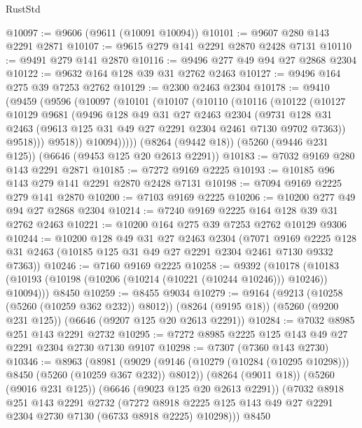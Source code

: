 \begin{lexlean}{RustStd}
\begin{coremodule}
@10097 := @9606 (@9611 (@10091 @10094))
@10101 := @9607 @280 @143 @2291 @2871
@10107 := @9615 @279 @141 @2291 @2870 @2428 @7131
@10110 := @9491 @279 @141 @2870
@10116 := @9496 @277 @49 @94 @27 @2868 @2304
@10122 := @9632 @164 @128 @39 @31 @2762 @2463
@10127 := @9496 @164 @275 @39 @7253 @2762
@10129 := @2300 @2463 @2304
@10178 := @9410
    (@9459
      (@9596
        (@10097
          (@10101
            (@10107
              (@10110
                (@10116
                  (@10122
                    (@10127
                      @10129
                      @9681
                      (@9496
                        @128
                        @49
                        @31
                        @27
                        @2463
                        @2304
                        (@9731
                          @128
                          @31
                          @2463
                          (@9613 @125 @31 @49 @27 @2291 @2304 @2461 @7130 @9702 @7363))
                        @9518)))
                  @9518))
              @10094)))))
    (@8264 (@9442 @18))
    (@5260 (@9446 @231 @125))
    (@6646 (@9453 @125 @20 @2613 @2291))
@10183 := @7032 @9169 @280 @143 @2291 @2871
@10185 := @7272 @9169 @2225
@10193 := @10185 @96 @143 @279 @141 @2291 @2870 @2428 @7131
@10198 := @7094 @9169 @2225 @279 @141 @2870
@10200 := @7103 @9169 @2225
@10206 := @10200 @277 @49 @94 @27 @2868 @2304
@10214 := @7240 @9169 @2225 @164 @128 @39 @31 @2762 @2463
@10221 := @10200 @164 @275 @39 @7253 @2762 @10129 @9306
@10244 := @10200
    @128
    @49
    @31
    @27
    @2463
    @2304
    (@7071 @9169 @2225 @128 @31 @2463 (@10185 @125 @31 @49 @27 @2291 @2304 @2461 @7130 @9332 @7363))
@10246 := @7160 @9169 @2225
@10258 := @9392
    (@10178 (@10183 (@10193 (@10198 (@10206 (@10214 (@10221 (@10244 @10246))) @10246)) @10094)))
    @8450
@10259 := @8455 @9034
@10279 := @9164
    (@9213 (@10258 (@5260 (@10259 @362 @232)) @8012))
    (@8264 (@9195 @18))
    (@5260 (@9200 @231 @125))
    (@6646 (@9207 @125 @20 @2613 @2291))
@10284 := @7032 @8985 @251 @143 @2291 @2732
@10295 := @7272 @8985 @2225 @125 @143 @49 @27 @2291 @2304 @2730 @7130 @9107
@10298 := @7307 (@7360 @143 @2730)
@10346 := @8963
    (@8981
      (@9029 (@9146 (@10279 (@10284 (@10295 @10298))) @8450 (@5260 (@10259 @367 @232)) @8012))
      (@8264 (@9011 @18))
      (@5260 (@9016 @231 @125))
      (@6646 (@9023 @125 @20 @2613 @2291))
      (@7032
        @8918
        @251
        @143
        @2291
        @2732
        (@7272 @8918 @2225 @125 @143 @49 @27 @2291 @2304 @2730 @7130 (@6733 @8918 @2225) @10298)))
    @8450

\end{coremodule}
\end{lexlean}
